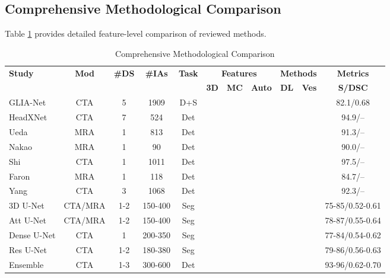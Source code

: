 \documentclass[conference]{IEEEtran}
\newcommand{\cmark}{\ding{51}}
\newcommand{\xmark}{\ding{55}}
\begin{document}
\subsection{Comprehensive Methodological Comparison}

Table \ref{tab:comprehensive} provides detailed feature-level comparison of reviewed methods.

\begin{table}[htbp]
\caption{Comprehensive Methodological Comparison}
\begin{center}
\scriptsize
\begin{tabular}{|l|c|c|c|c|c|c|c|c|c|c|}
\hline
\multirow{2}{*}{\textbf{Study}} & \multirow{2}{*}{\textbf{Mod}} & \multirow{2}{*}{\textbf{\#DS}} & \multirow{2}{*}{\textbf{\#IAs}} & \multirow{2}{*}{\textbf{Task}} & \multicolumn{3}{c|}{\textbf{Features}} & \multicolumn{2}{c|}{\textbf{Methods}} & \textbf{Metrics} \\
\cline{6-11}
& & & & & \textbf{3D} & \textbf{MC} & \textbf{Auto} & \textbf{DL} & \textbf{Ves} & \textbf{S/DSC} \\
\hline
GLIA-Net \cite{bo2021toward} & CTA & 5 & 1909 & D+S & \cmark & \cmark & \cmark & \cmark & \cmark & 82.1/0.68 \\
\hline
HeadXNet \cite{park2019headxnet} & CTA & 7 & 524 & Det & \cmark & \cmark & \cmark & \cmark & \xmark & 94.9/-- \\
\hline
Ueda \cite{ueda2019deep} & MRA & 1 & 813 & Det & \cmark & \xmark & \cmark & \cmark & \xmark & 91.3/-- \\
\hline
Nakao \cite{nakao2018deep} & MRA & 1 & 90 & Det & \cmark & \xmark & \cmark & \cmark & \xmark & 90.0/-- \\
\hline
Shi \cite{shi2020deep} & CTA & 1 & 1011 & Det & \cmark & \xmark & \cmark & \cmark & \cmark & 97.5/-- \\
\hline
Faron \cite{faron2020performance} & MRA & 1 & 118 & Det & \cmark & \xmark & \cmark & \cmark & \xmark & 84.7/-- \\
\hline
Yang \cite{yang2021intracranial} & CTA & 3 & 1068 & Det & \cmark & \cmark & \cmark & \cmark & \cmark & 92.3/-- \\
\hline
3D U-Net & CTA/MRA & 1-2 & 150-400 & Seg & \cmark & \xmark & \cmark & \cmark & \cmark & 75-85/0.52-0.61 \\
\hline
Att U-Net & CTA/MRA & 1-2 & 150-400 & Seg & \cmark & \xmark & \cmark & \cmark & \cmark & 78-87/0.55-0.64 \\
\hline
Dense U-Net & CTA & 1 & 200-350 & Seg & \cmark & \xmark & \cmark & \cmark & \cmark & 77-84/0.54-0.62 \\
\hline
Res U-Net & CTA & 1-2 & 180-380 & Seg & \cmark & \xmark & \cmark & \cmark & \cmark & 79-86/0.56-0.63 \\
\hline
Ensemble & CTA & 1-3 & 300-600 & Det & \cmark & \cmark & \cmark & \cmark & \cmark & 93-96/0.62-0.70 \\
\hline

\end{tabular}
\label{tab:comprehensive}
\end{center}
\end{table}
\end{document}
